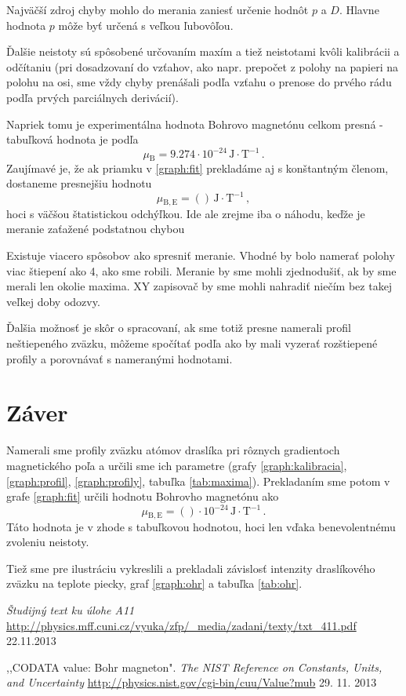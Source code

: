 \documentclass[a4paper, 10pt]{article}
\newcommand{\unit}[1]{\ensuremath{\, \mathrm{#1}}}
\newcommand{\di}[1]{\ensuremath{_\mathrm{#1}}}
\begin{document}
Najväčší zdroj chyby mohlo do merania zaniesť určenie hodnôt $p$ a $D$. Hlavne hodnota $p$ môže byť určená s veľkou ľubovôľou. 

Ďalšie neistoty sú spôsobené určovaním maxím a tiež neistotami kvôli kalibrácii a odčítaniu (pri dosadzovaní do vzťahov, ako napr. prepočet z polohy na papieri na polohu na osi, sme vždy chyby prenášali podľa vzťahu o prenose do prvého rádu podľa prvých parciálnych derivácií). 

Napriek tomu je experimentálna hodnota Bohrovo magnetónu celkom presná - tabuľková hodnota je podľa \cite{bohr}
$$
\mu\di B = 9.274 \cdot 10^{-24} \unit{J\cdot T^{-1}}\,.
$$
Zaujímavé je, že ak priamku v \ref{graph:fit} prekladáme aj s konštantným členom, dostaneme presnejšiu hodnotu 
$$
\mu\di {B, E} = ()\unit{J\cdot T^{-1}}\,,
$$
hoci s väčšou štatistickou odchýľkou. Ide ale zrejme iba o náhodu, keďže je meranie zaťažené podstatnou chybou

Existuje viacero spôsobov ako spresniť meranie. Vhodné by bolo namerať polohy viac štiepení ako 4, ako sme robili. Meranie by sme mohli zjednodušiť, ak by sme merali len okolie maxima. XY zapisovač by sme mohli nahradiť niečím bez takej veľkej doby odozvy.

Ďalšia možnosť je skôr o spracovaní, ak sme totiž presne namerali profil neštiepeného zväzku, môžeme spočítať podľa \cite{stud} ako by mali vyzerať rozštiepené profily a porovnávať s nameranými hodnotami.
\section*{Záver}
Namerali sme profily zväzku atómov draslíka pri rôznych gradientoch magnetického poľa a určili sme ich parametre (grafy \ref{graph:kalibracia}, \ref{graph:profil}, \ref{graph:profily}, tabuľka \ref{tab:maxima}). Prekladaním sme potom v grafe \ref{graph:fit} určili hodnotu Bohrovho magnetónu ako
$$
\mu\di {B, E} = ()\cdot 10^{-24}\unit{J\cdot T^{-1}}\,.
$$
Táto hodnota je v zhode s tabuľkovou hodnotou, hoci len vďaka benevolentnému zvoleniu neistoty.

Tiež sme pre ilustráciu vykreslili a prekladali závislosť intenzity draslíkového zväzku na teplote piecky, graf \ref{graph:ohr} a tabuľka \ref{tab:ohr}.

\begin{thebibliography}{9}

    \emph{Študijný text ku úlohe A11} \\
    \url{http://physics.mff.cuni.cz/vyuka/zfp/_media/zadani/texty/txt_411.pdf} 22.11.2013

    ,,CODATA value: Bohr magneton". \textit{The NIST Reference on Constants, Units, and Uncertainty} \url{http://physics.nist.gov/cgi-bin/cuu/Value?mub} 29. 11. 2013

\end{thebibliography}
\end{document}
